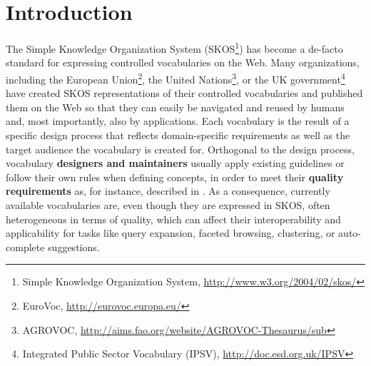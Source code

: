 \section{Introduction}\label{sec:introduction}

The Simple Knowledge Organization System (SKOS\footnote{Simple Knowledge Organization System, \url{http://www.w3.org/2004/02/skos/}}) has become a de-facto standard for expressing controlled vocabularies on the Web. Many organizations, including the European Union\footnote{EuroVoc, \url{http://eurovoc.europa.eu/}}, the United Nations\footnote{AGROVOC, \url{http://aims.fao.org/website/AGROVOC-Thesaurus/sub}}, or the UK government\footnote{Integrated Public Sector Vocabulary (IPSV), \url{http://doc.esd.org.uk/IPSV}} have created SKOS representations of their controlled vocabularies and published them on the Web so that they can easily be navigated and reused by humans and, most importantly, also by applications. Each vocabulary is the result of a specific design process that reflects domain-specific requirements as well as the target audience the vocabulary is created for. Orthogonal to the design process, vocabulary \textbf{designers and maintainers} usually apply existing guidelines or follow their own rules when defining concepts, in order to meet their \textbf{quality requirements} as, for instance, described in \cite{Coronado2009}. As a consequence, currently available vocabularies are, even though they are expressed in SKOS, often heterogeneous in terms of quality, which can affect their interoperability and applicability for tasks like query expansion, faceted browsing, clustering, or auto-complete suggestions.


